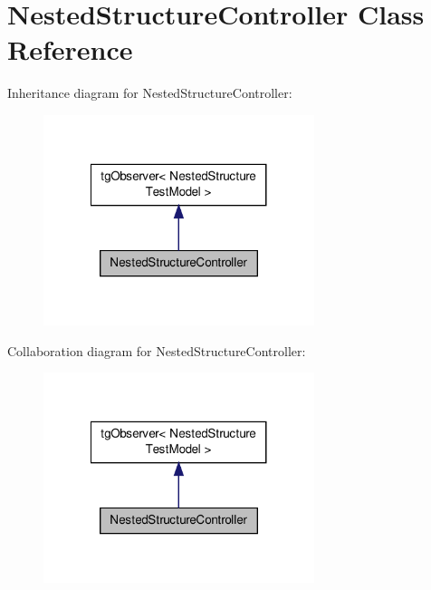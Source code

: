 \hypertarget{class_nested_structure_controller}{\section{Nested\-Structure\-Controller Class Reference}
\label{class_nested_structure_controller}
}


Inheritance diagram for Nested\-Structure\-Controller\-:\nopagebreak
\begin{figure}[H]
\begin{center}
\leavevmode
\includegraphics[width=224pt]{class_nested_structure_controller__inherit__graph}
\end{center}
\end{figure}


Collaboration diagram for Nested\-Structure\-Controller\-:\nopagebreak
\begin{figure}[H]
\begin{center}
\leavevmode
\includegraphics[width=224pt]{class_nested_structure_controller__coll__graph}
\end{center}
\end{figure}
